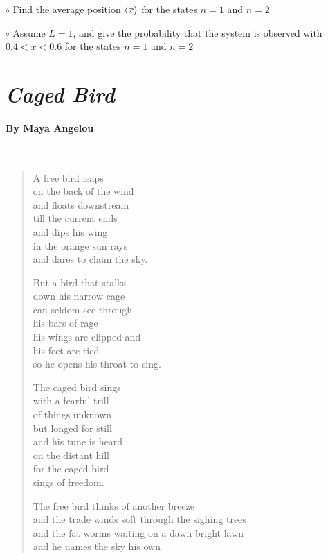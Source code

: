 \documentclass[11pt, letterpaper]{memoir}
\begin{document}
{\vspace{10em}\noindent
$\circ$ Find the average position $\left< x \right>$ for the states $n=1$ and $n=2$

\vspace{13em}\noindent
$\circ$ Assume $L=1$, and give the probability that the system is observed with $0.4<x<0.6$ for the states $n=1$ and $n=2$

\newpage
\pagestyle{empty}
\addtocounter{page}{-1}
\section*{\emph{Caged Bird}}
\paragraph{By Maya Angelou}~
\begin{verse}
	A free bird leaps\\
	on the back of the wind\\
	and floats downstream\\
	till the current ends\\
	and dips his wing\\
	in the orange sun rays\\
	and dares to claim the sky.

	But a bird that stalks\\
	down his narrow cage\\
	can seldom see through\\
	his bars of rage\\
	his wings are clipped and\\
	his feet are tied\\
	so he opens his throat to sing.

	The caged bird sings\\
	with a fearful trill\\
	of things unknown\\
	but longed for still\\
	and his tune is heard\\
	on the distant hill\\
	for the caged bird\\
	sings of freedom.

	The free bird thinks of another breeze\\
	and the trade winds soft through the sighing trees\\
	and the fat worms waiting on a dawn bright lawn\\
	and he names the sky his own


\end{verse}}
\end{document}
